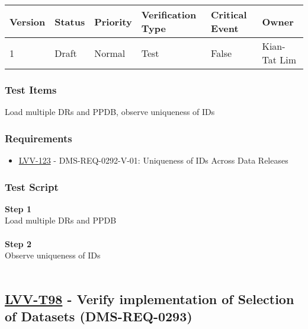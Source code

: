 \begin{longtable}[]{@{}llllll@{}}
\toprule
Version & Status & Priority & Verification Type & Critical Event &
Owner\tabularnewline
\midrule
\endhead
1 & Draft & Normal & Test & False & Kian-Tat Lim\tabularnewline
\bottomrule
\end{longtable}

\hypertarget{test-items-73}{%
\subsubsection{Test Items}\label{test-items-73}}

Load multiple DRs and PPDB, observe uniqueness of IDs

\hypertarget{requirements-74}{%
\subsubsection{Requirements}\label{requirements-74}}

\begin{itemize}
\tightlist
\item
  \href{https://jira.lsstcorp.org/browse/LVV-123}{LVV-123} -
  DMS-REQ-0292-V-01: Uniqueness of IDs Across Data Releases
\end{itemize}

\hypertarget{test-script-74}{%
\subsubsection{Test Script}\label{test-script-74}}

\textbf{Step 1}\\
Load multiple DRs and PPDB\\
~\\
\textbf{Step 2}\\
Observe uniqueness of IDs\\
~\\

\hypertarget{lvv-t98---verify-implementation-of-selection-of-datasets-dms-req-0293}{%
\subsection{\texorpdfstring{\href{https://jira.lsstcorp.org/secure/Tests.jspa\#/testCase/LVV-T98}{LVV-T98}
- Verify implementation of Selection of Datasets
(DMS-REQ-0293)}{LVV-T98 - Verify implementation of Selection of Datasets (DMS-REQ-0293)}}\label{lvv-t98---verify-implementation-of-selection-of-datasets-dms-req-0293}}

